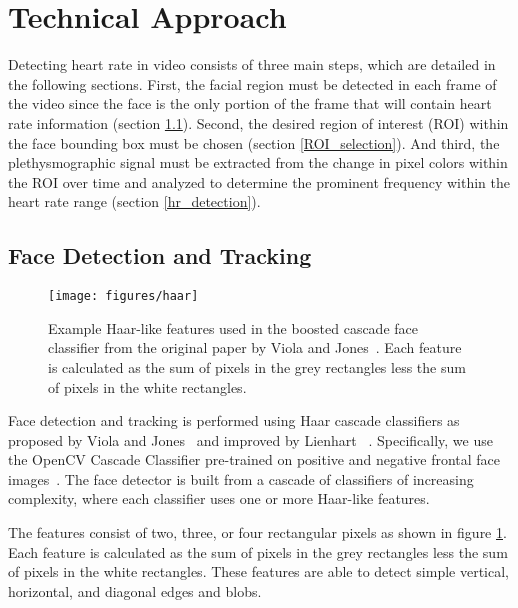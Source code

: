 \documentclass[10pt,twocolumn,letterpaper]{article}
\begin{document}
\section{Technical Approach} \label{tech_approach}

Detecting heart rate in video consists of three main steps, which are detailed in the following sections. First, the facial region must be detected in each frame of the video since the face is the only portion of the frame that will contain heart rate information (section \ref{face_detection}). Second, the desired region of interest (ROI) within the face bounding box must be chosen (section \ref{ROI_selection}). And third, the plethysmographic signal must be extracted from the change in pixel colors within the ROI over time and analyzed to determine the prominent frequency within the heart rate range (section \ref{hr_detection}).

\subsection{Face Detection and Tracking} \label{face_detection}

\begin{figure}
\begin{center}
	\texttt{[image: figures/haar]}
\end{center}
\caption{Example Haar-like features used in the boosted cascade face classifier from the original paper by Viola and Jones~\cite{Viola:2001aa}. Each feature is calculated as the sum of pixels in the grey rectangles less the sum of pixels in the white rectangles.}
\label{haar}
\end{figure}

Face detection and tracking is performed using Haar cascade classifiers as proposed by Viola and Jones~\cite{Viola:2001aa} and improved by Lienhart \etal~\cite{Leinhart:2002aa}. Specifically, we use the OpenCV Cascade Classifier pre-trained on positive and negative frontal face images~\cite{opencv_library}. The face detector is built from a cascade of classifiers of increasing complexity, where each classifier uses one or more Haar-like features.

The features consist of two, three, or four rectangular pixels as shown in figure \ref{haar}. Each feature is calculated as the sum of pixels in the grey rectangles less the sum of pixels in the white rectangles. These features are able to detect simple vertical, horizontal, and diagonal edges and blobs. 
\end{document}
